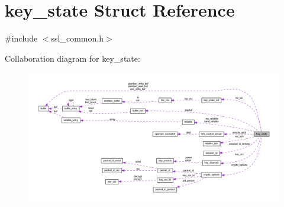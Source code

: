 \hypertarget{structkey__state}{}\section{key\+\_\+state Struct Reference}
\label{structkey__state}


{\ttfamily \#include $<$ssl\+\_\+common.\+h$>$}



Collaboration diagram for key\+\_\+state\+:
\nopagebreak
\begin{figure}[H]
\begin{center}
\leavevmode
\includegraphics[width=350pt]{structkey__state__coll__graph}
\end{center}
\end{figure}
